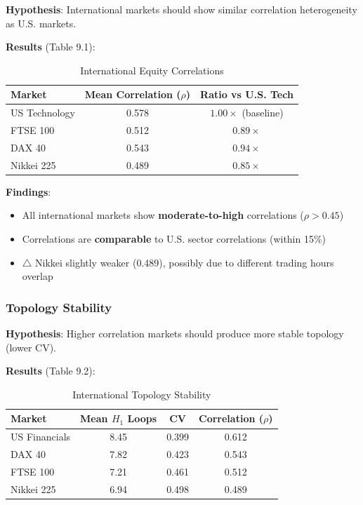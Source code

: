 \textbf{Hypothesis}: International markets should show similar correlation heterogeneity as U.S. markets.

\textbf{Results} (Table 9.1):

\begin{table}[H]
\centering
\caption{International Equity Correlations}
\label{tab:intl-correlations}
\begin{tabular}{@{}lcc@{}}
\toprule
\textbf{Market} & \textbf{Mean Correlation ($\rho$)} & \textbf{Ratio vs U.S. Tech} \\
\midrule
US Technology & 0.578 & $1.00\times$ (baseline) \\
FTSE 100 & 0.512 & $0.89\times$ \\
DAX 40 & 0.543 & $0.94\times$ \\
Nikkei 225 & 0.489 & $0.85\times$ \\
\bottomrule
\end{tabular}
\end{table}

\textbf{Findings}:
\begin{itemize}
\item \checkmark All international markets show \textbf{moderate-to-high} correlations ($\rho > 0.45$)
\item \checkmark Correlations are \textbf{comparable} to U.S. sector correlations (within 15\%)
\item $\triangle$ Nikkei slightly weaker (0.489), possibly due to different trading hours overlap
\end{itemize}

\subsubsection{Topology Stability}

\textbf{Hypothesis}: Higher correlation markets should produce more stable topology (lower CV).

\textbf{Results} (Table 9.2):

\begin{table}[H]
\centering
\caption{International Topology Stability}
\label{tab:intl-topology}
\begin{tabular}{@{}lccc@{}}
\toprule
\textbf{Market} & \textbf{Mean $H_1$ Loops} & \textbf{CV} & \textbf{Correlation ($\rho$)} \\
\midrule
US Financials & 8.45 & 0.399 & 0.612 \\
DAX 40 & 7.82 & 0.423 & 0.543 \\
FTSE 100 & 7.21 & 0.461 & 0.512 \\
Nikkei 225 & 6.94 & 0.498 & 0.489 \\
\bottomrule
\end{tabular}
\end{table}

